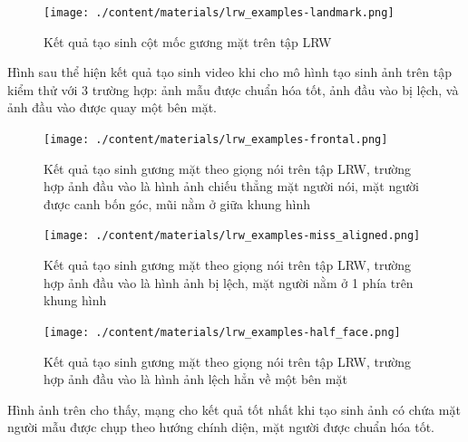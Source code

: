 \begin{figure}[H]
    \centering
    \texttt{[image: ./content/materials/lrw\_examples-landmark.png]}
    \caption{Kết quả tạo sinh cột mốc gương mặt trên tập LRW}
\end{figure}

Hình sau thể hiện kết quả tạo sinh video khi cho mô hình tạo sinh ảnh trên tập kiểm thử với 3 trường hợp: ảnh mẫu được chuẩn hóa tốt, ảnh đầu vào bị lệch, và ảnh đầu vào được quay một bên mặt.

\begin{figure}[H]
    \centering
    \texttt{[image: ./content/materials/lrw\_examples-frontal.png]}
    \caption{Kết quả tạo sinh gương mặt theo giọng nói trên tập LRW, trường hợp ảnh đầu vào là hình ảnh chiếu thẳng mặt người nói, mặt người được canh bốn góc, mũi nằm ở giữa khung hình}
\end{figure}

\begin{figure}[H]
    \centering
    \texttt{[image: ./content/materials/lrw\_examples-miss\_aligned.png]}
    \caption{Kết quả tạo sinh gương mặt theo giọng nói trên tập LRW, trường hợp ảnh đầu vào là hình ảnh bị lệch, mặt người nằm ở 1 phía trên khung hình}
\end{figure}

\begin{figure}[H]
    \centering
    \texttt{[image: ./content/materials/lrw\_examples-half\_face.png]}
    \caption{Kết quả tạo sinh gương mặt theo giọng nói trên tập LRW, trường hợp ảnh đầu vào là hình ảnh lệch hẳn về một bên mặt}
\end{figure}

Hình ảnh trên cho thấy, mạng cho kết quả tốt nhất khi tạo sinh ảnh có chứa mặt người mẫu được chụp theo hướng chính diện, mặt người được chuẩn hóa tốt.
